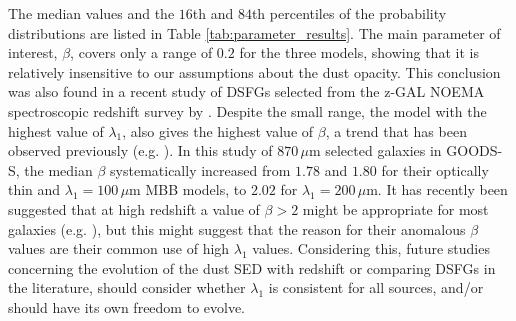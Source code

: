 The median values and the $16$th and $84$th percentiles of the probability distributions are listed in Table \ref{tab:parameter_results}. The main parameter of interest, $\beta$, covers only a range of $0.2$ for the three models, showing that it is relatively insensitive to our assumptions about the dust opacity. This conclusion was also found in a recent study of DSFGs selected from the z-GAL NOEMA spectroscopic redshift survey by \citealt{Ismail_2023}. Despite the small range, the model with the highest value of $\lambda_1$, also gives the highest value of $\beta$, a trend that has been observed previously (e.g. \citealt{McKay_2023}). In this study of $870\,\mu$m selected galaxies in GOODS-S, the median $\beta$ systematically increased from $1.78$ and $1.80$ for their optically thin and $\lambda_1 = 100\,\mu$m MBB models, to $2.02$ for $\lambda_1 = 200\,\mu$m. It has recently been suggested that at high redshift a value of $\beta > 2$ might be appropriate for most galaxies (e.g. \citealt{Casey_2019, Casey_2021, Cooper_2022}), but this might suggest that the reason for their anomalous $\beta$ values are their common use of high $\lambda_1$ values. Considering this, future studies concerning the evolution of the dust SED with redshift or comparing DSFGs in the literature, should consider whether $\lambda_1$ is consistent for all sources, and/or should have its own freedom to evolve.

